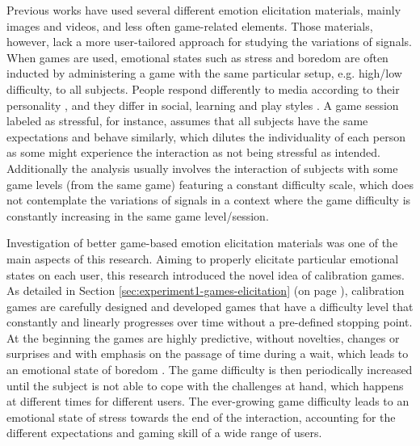 
Previous works have used several different emotion elicitation materials, mainly images and videos, and less often game-related elements. Those materials, however, lack a more user-tailored approach for studying the variations of signals. When games are used, emotional states such as stress and boredom are often inducted by administering a game with the same particular setup, e.g. high/low difficulty, to all subjects. People respond differently to media according to their personality \parencite{ravaja2004effects}, and they differ in social, learning and play styles \parencite{goldberg1993structure}. A game session labeled as stressful, for instance, assumes that all subjects have the same expectations and behave similarly, which dilutes the individuality of each person as some might experience the interaction as not being stressful as intended. Additionally the analysis usually involves the interaction of subjects with some game levels (from the same game) featuring a constant difficulty scale, which does not contemplate the variations of signals in a context where the game difficulty is constantly increasing in the same game level/session.

Investigation of better game-based emotion elicitation materials was one of the main aspects of this research. Aiming to properly elicitate particular emotional states on each user, this research introduced the novel idea of calibration games. As detailed in Section \ref{sec:experiment1-games-elicitation} (on page \pageref{sec:experiment1-games-elicitation}), calibration games are carefully designed and developed games that have a difficulty level that constantly and linearly progresses over time without a pre-defined stopping point. At the beginning the games are highly predictive, without novelties, changes or surprises and with emphasis on the passage of time during a wait, which leads to an emotional state of boredom \parencite{van2010behave,koster2013theory,schell2014art}. The game difficulty is then periodically increased until the subject is not able to cope with the challenges at hand, which happens at different times for different users. The ever-growing game difficulty leads to an emotional state of stress towards the end of the interaction, accounting for the different expectations and gaming skill of a wide range of users.

